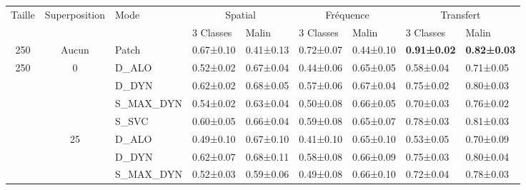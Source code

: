 \begin{landscape}

\begin{table}[H]
    \centering
    \begin{tabular}{cclllllll}
		\toprule
		\multirow{2}{*}{Taille}     & \multirow{2}{*}{Superposition}    & \multirow{2}{*}{Mode}     & \multicolumn{2}{c}{Spatial}       & \multicolumn{2}{c}{Fréquence}     & \multicolumn{2}{c}{Transfert}         \\
		                            &                                   &                           & 3 Classes         & Malin         & 3 Classes         & Malin         & 3 Classes         & Malin             \\ \midrule
		250                         & Aucun                             & Patch                     & 0.67±0.10         & 0.41±0.13     & 0.72±0.07         & 0.44±0.10     & \textbf{0.91±0.02}& \textbf{0.82±0.03}\\ \midrule
		\multirow{12}{*}{250}       & \multirow{4}{*}{0}                & D\_ALO                    & 0.52±0.02         & 0.67±0.04     & 0.44±0.06         & 0.65±0.05     & 0.58±0.04         & 0.71±0.05         \\ 
							        &                                   & D\_DYN                    & 0.62±0.02         & 0.68±0.05     & 0.57±0.06         & 0.67±0.04     & 0.75±0.02         & 0.80±0.03         \\
							        &                                   & S\_MAX\_DYN               & 0.54±0.02         & 0.63±0.04     & 0.50±0.08         & 0.66±0.05     & 0.70±0.03         & 0.76±0.02         \\
							        &                                   & S\_SVC                    & 0.60±0.05         & 0.66±0.04     & 0.59±0.08         & 0.65±0.07     & 0.78±0.03         & 0.81±0.03         \\ \cline{2-9}
							        & \multirow{4}{*}{25}               & D\_ALO                    & 0.49±0.10         & 0.67±0.10     & 0.41±0.10         & 0.65±0.10     & 0.53±0.05         & 0.70±0.09         \\
							        &                                   & D\_DYN                    & 0.62±0.07         & 0.68±0.11     & 0.58±0.08         & 0.66±0.09     & 0.75±0.03         & 0.80±0.04         \\
							        &                                   & S\_MAX\_DYN               & 0.52±0.03         & 0.59±0.06     & 0.49±0.08         & 0.66±0.10     & 0.72±0.04         & 0.78±0.03         \\

\end{tabular}
\end{table}
\end{landscape}
